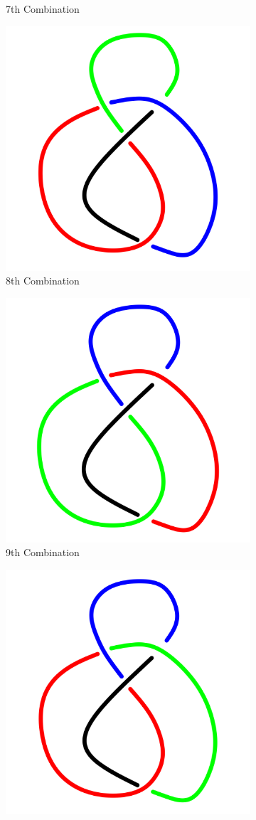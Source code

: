 \documentclass[a4paper,9pt]{article}
\begin{document}
\begin{enumerate}
\begin{figure}[h!]
\begin{subfigure}[b]{0.25\linewidth}
	\caption{7th Combination}
\end{subfigure}
\qquad
\begin{subfigure}[b]{0.25\linewidth}
	\centering
	\includegraphics[width=0.5\linewidth]{picture/knotpict/knot-8}
	\caption{8th Combination}
\end{subfigure}
\qquad
\begin{subfigure}[b]{0.25\linewidth}
	\centering
	\includegraphics[width=0.5\linewidth]{picture/knotpict/knot-9}
	\caption{9th Combination}
\end{subfigure}
\qquad
\begin{subfigure}[b]{0.25\linewidth}
	\centering
	\includegraphics[width=0.5\linewidth]{picture/knotpict/knot-10}

\end{subfigure}
\end{figure}
\end{enumerate}
\end{document}

